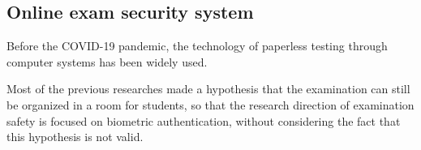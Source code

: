\subsection{Online exam security system}
\label{sec:Online exam security system}
Before the COVID-19 pandemic, the technology of paperless testing through computer systems has been widely used. %

Most of the previous researches made a hypothesis that the examination can still be organized in a room for students, so that the research direction of examination safety is focused on biometric authentication, without considering the fact that this hypothesis is not valid.
\citet{traore2017ensuring}

\citet{Akiko202144107}

\citet{garg2020convolutional}

